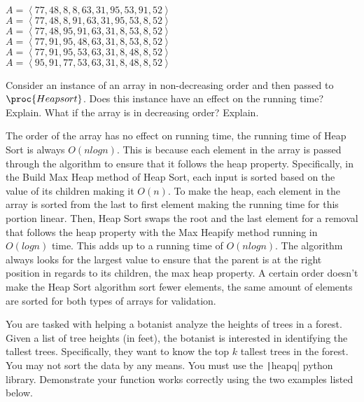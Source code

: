 \documentclass[addpoints,11pt]{exam}
\begin{document}
\begin{questions}
\begin{solutionorbox}
 \\$A = \left< 77, 48, 8, 8, 63, 31, 95, 53, 91, 52\right>$
 \\$A = \left< 77, 48, 8, 91, 63, 31, 95, 53, 8, 52\right>$
 \\$A = \left< 77, 48, 95, 91, 63, 31, 8, 53, 8, 52\right>$
 \\$A = \left< 77, 91, 95, 48, 63, 31, 8, 53, 8, 52\right>$
 \\$A = \left< 77, 91, 95, 53, 63, 31, 8, 48, 8, 52\right>$
 \\$A = \left< 95, 91, 77, 53, 63, 31, 8, 48, 8, 52\right>$
\end{solutionorbox}

\newpage


\question[5]
Consider an instance of an array in non-decreasing order and then passed to $\proc{Heapsort}$.  Does this instance have an effect on the running time?  Explain.  What if the array is in decreasing order?  Explain.

\begin{solutionorbox}
	The order of the array has no effect on running time, the running time of Heap Sort is always $O(nlogn)$. This is because each element in the array is passed through the algorithm to ensure that it follows the heap property. Specifically, in the Build Max Heap method of Heap Sort, each input is sorted based on the value of its children making it $O(n)$. To make the heap, each element in the array is sorted from the last to first element making the running time for this portion linear. Then, Heap Sort swaps the root and the last element for a removal that follows the heap property with the Max Heapify method running in $O(logn)$ time. This adds up to a running time of $O(nlogn)$. The algorithm always looks for the largest value to ensure that the parent is at the right position in regards to its children, the max heap property. A certain order doesn't make the Heap Sort algorithm sort fewer elements, the same amount of elements are sorted for both types of arrays for validation. 
\end{solutionorbox}

\newpage


\question [20]
You are tasked with helping a botanist analyze the heights of trees in a forest. Given a list of tree heights (in feet), the botanist is interested in identifying the tallest trees. Specifically, they want to know the top $k$ tallest trees in the forest.  You may not sort the data by any means.  You must use the \texttt|heapq| python library.  Demonstrate your function works correctly using the two examples listed below.\\


\end{questions}
\end{document}
